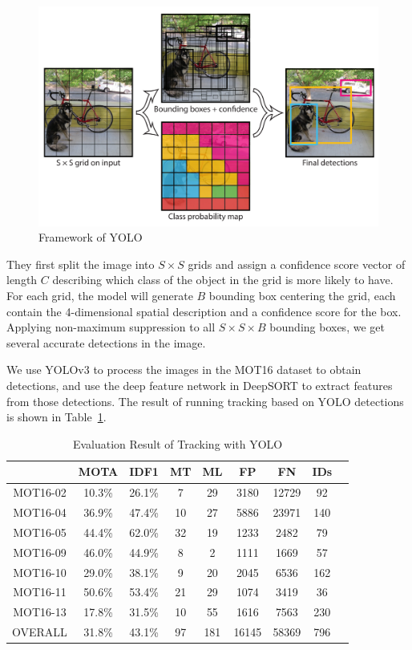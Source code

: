 \documentclass[conference]{IEEEtran}
\begin{document}
\begin{figure}[h]
    \centering
    \includegraphics[width=\linewidth]{fig/yolo.png}
    \caption{Framework of YOLO\protect\footnotemark}
    \label{fig:yolo}
\end{figure}

They first split the image into $S \times S$ grids and assign a confidence score vector of length $C$ describing which class of the object in the grid is more likely to have.
For each grid, the model will generate $B$ bounding box centering the grid, each contain the 4-dimensional spatial description and a confidence score for the box.
Applying non-maximum suppression to all $S \times S \times B$ bounding boxes, we get several accurate detections in the image.

We use YOLOv3\cite{yolov3} to process the images in the MOT16 dataset to obtain detections, and use the deep feature network in DeepSORT to extract features from those detections.
The result of running tracking based on YOLO detections is shown in Table~\ref{tab:eval-yolo}.

\begin{table}[h]
    \caption{Evaluation Result of Tracking with YOLO}
    \label{tab:eval-yolo}
    \begin{tabular}{ccccccccc}
        \hline
        & MOTA & IDF1 & MT & ML & FP & FN & IDs\\\hline
        MOT16-02 & 10.3\% & 26.1\% & 7 & 29 & 3180 & 12729 & 92\\
        MOT16-04 & 36.9\% & 47.4\% & 10 & 27 & 5886 & 23971 & 140\\
        MOT16-05 & 44.4\% & 62.0\% & 32 & 19 & 1233 & 2482 & 79\\
        MOT16-09 & 46.0\% & 44.9\% & 8 & 2 & 1111 & 1669 & 57\\
        MOT16-10 & 29.0\% & 38.1\% & 9 & 20 & 2045 & 6536 & 162\\
        MOT16-11 & 50.6\% & 53.4\% & 21 & 29 & 1074 & 3419 & 36\\
        MOT16-13 & 17.8\% & 31.5\% & 10 & 55 & 1616 & 7563 & 230\\
        OVERALL & 31.8\% & 43.1\% & 97 & 181 & 16145 & 58369 & 796\\\hline
    \end{tabular}
\end{table}
\end{document}
